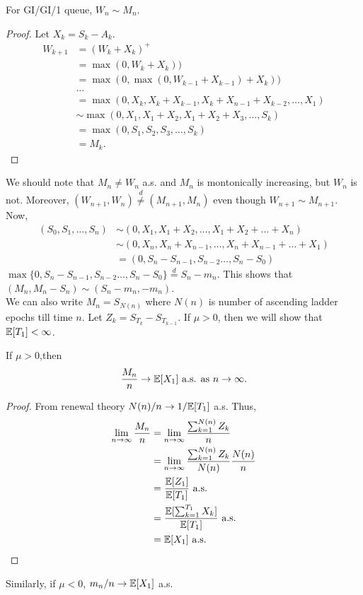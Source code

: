 \documentclass[all-lectures.tex]{subfiles}
\begin{document}
\begin{prop}
For GI/GI/1 queue, $W_n \sim M_n$.
\begin{proof}
Let $X_k = S_k - A_k$.
\begin{align*}
W_{k+1} &= (W_k + X_k)^+ \\
&= \max(0,W_k + X_k)) \\
&= \max(0,\max(0,W_{k-1}+X_{k-1}) + X_k)) \\
& \dots \\
&= \max(0,X_k,X_k+X_{k-1},X_k+X_{n-1}+X_{k-2},\dots,X_1) \\
&\sim \max(0,X_1,X_1+X_{2},X_1+X_{2}+X_{3},\dots,S_k) \\
&= \max(0,S_1,S_2,S_3,\dots,S_k) \\
&= M_k.
\end{align*}
\end{proof}
\end{prop}
We should note that $M_n \neq W_n$ a.s. and  $M_n$ is montonically increasing, but $W_n$ is not. Moreover, $(W_{n+1},W_n) \stackrel{d}{\neq} (M_{n+1},M_{n})$ even though $W_{n+1} \sim M_{n+1}$.
Now, 
\begin{align*}
(S_0,S_1,\dots,S_n) &\sim (0,X_1,X_1+X_2,\dots,X_1+X_2+\dots+X_n) \\
&\sim (0,X_n,X_n+X_{n-1},\dots,X_n+X_{n-1}+\dots +X_1)\\
&= (0,S_n-S_{n-1},S_{n-2}\dots, S_n - S_0)
\end{align*}
$\max\{0,S_n-S_{n-1},S_{n-2}\dots, S_n - S_0\} \stackrel{d}{=} S_n - m_n$. This shows that $(M_n,M_n - S_n) \sim (S_n - m_n, -m_n)$. \\
\indent We can also write $M_n = S_{N(n)}$ where $N(n)$ is number of ascending ladder epochs till time $n$. Let $Z_k = S_{T_k} -S_{T_{k-1}}$. If $\mu > 0$, then we will show that $\mathbb{E}[T_1] < \infty$.
\begin{prop}
If $\mu >0$,then 
\begin{align*}
\frac{M_n}{n} \to \mathbb{E}[X_1] \text{ a.s. as } n \to \infty.
\end{align*}
\begin{proof} From renewal theory $N(n)/n \to 1/\mathbb{E}[T_1]$ a.s. Thus, 
\begin{align*}
\lim_{n \to \infty} \frac{M_n}{n} &= \lim_{n \to \infty} \frac{\sum_{k=1}^{N(n)} Z_k}{n}\\
&= \lim_{n \to \infty} \frac{\sum_{k=1}^{N(n)} Z_k}{N(n)} \frac{N(n)}{n} \\
&= \frac{\mathbb{E}[Z_1]}{\mathbb{E}[T_1]} \text{ a.s.}\\
&= \frac{\mathbb{E}[\sum_{k=1}^{T_1} X_k]}{\mathbb{E}[T_1]}\text{ a.s.}\\
&= \mathbb{E}[X_1] \text{ a.s.} \qedhere
\end{align*}

\end{proof}
\end{prop}
Similarly, if $\mu <0$, $m_n/n \to \mathbb{E}[X_1]$ a.s.\\
\end{document}
